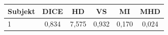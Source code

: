 \begin{tabular}{l c c c c c}
 \hline
Subjekt & DICE & HD & VS & MI & MHD \\ \hline
1 & 0,834 & 7,575 & 0,932 & 0,170 & 0,024 \\
\hline 
 \end{tabular}
